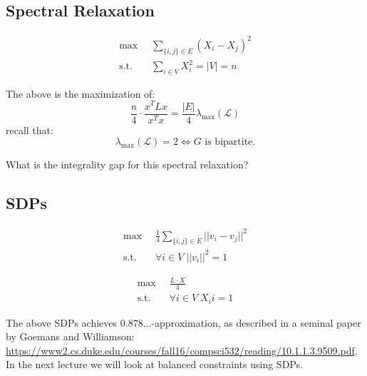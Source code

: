 \documentclass[11pt]{article}
\begin{document}
\subsection*{Spectral Relaxation}

\begin{align*}
    \max \;&\;\sum_{\{i,j\}\in E}(X_i-X_j)^2\\
    \text{s.t.}\; &\; \sum_{i\in V}{X_i^2} = |V| = n
\end{align*}

The above is the maximization of:
\[
    \frac{n}{4}\cdot \frac{x^TLx}{x^Tx} = \frac{|E|}{4}\lambda_{\max}(\mathcal{L})
\]
recall that:
\[
    \lambda_{\max}(\mathcal{L})= 2 \iff G\text{ is bipartite.}
\]

What is the integrality gap for this spectral relaxation?


\subsection*{SDPs}
\begin{align*}
    \max \;&\; \frac{1}{4}\sum_{\{i,j\}\in E}||v_i-v_j||^2\\
    \text{s.t.}\; &\; \forall i\in V \; ||v_i||^2 = 1
\end{align*}

\begin{align*}
    \max \;&\;  \frac{L \cdot X}{4}\\
    \text{s.t.}\; &\; \forall i\in V \; X_ii = 1
\end{align*}

The above SDPs achieves $0.878...$-approximation, as described in a seminal paper by Goemans and Williamson: \url{https://www2.cs.duke.edu/courses/fall16/compsci532/reading/10.1.1.3.9509.pdf}. In the next lecture we will look at balanced constraints using SDPs.
\end{document}
